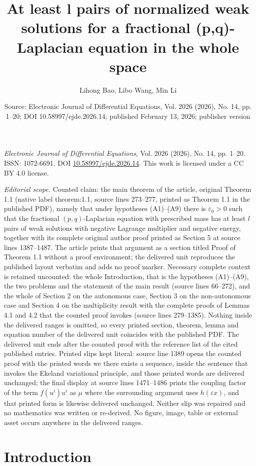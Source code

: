 \documentclass[10pt,a4paper]{amsart}
\title[At least l pairs of normalized weak solutions for a fractional]{At least l pairs of normalized weak solutions for a fractional (p,q)-Laplacian equation in the whole space}
\author{Lihong Bao, Libo Wang, Min Li}
\date{Source: Electronic Journal of Differential Equations, Vol. 2026 (2026), No. 14, pp. 1--20; DOI 10.58997/ejde.2026.14; published February 13, 2026; publisher version}
\numberwithin{equation}{section}
\begin{document}
\maketitle
\noindent\emph{Electronic Journal of Differential Equations}, Vol. 2026 (2026), No. 14, pp. 1--20.\newline
ISSN: 1072-6691. DOI \href{https://doi.org/10.58997/ejde.2026.14}{10.58997/ejde.2026.14}. This work is licensed under a CC BY 4.0 license.\par\smallskip
\noindent\textit{Editorial scope.} Counted claim: the main theorem of the article, original Theorem 1.1 (native label theorem:1.1, source lines 273--277, printed as Theorem 1.1 in the published PDF), namely that under hypotheses (A1)--(A9) there is $\varepsilon_0>0$ such that the fractional $(p,q)$-Laplacian equation with prescribed mass has at least $l$ pairs of weak solutions with negative Lagrange multiplier and negative energy, together with its complete original author proof printed as Section 5 at source lines 1387--1487. The article prints that argument as a section titled Proof of Theorem 1.1 without a proof environment; the delivered unit reproduces the published layout verbatim and adds no proof marker. Necessary complete context is retained uncounted: the whole Introduction, that is the hypotheses (A1)--(A9), the two problems and the statement of the main result (source lines 66--272), and the whole of Section 2 on the autonomous case, Section 3 on the non-autonomous case and Section 4 on the multiplicity result with the complete proofs of Lemmas 4.1 and 4.2 that the counted proof invokes (source lines 279--1385). Nothing inside the delivered ranges is omitted, so every printed section, theorem, lemma and equation number of the delivered unit coincides with the published PDF. The delivered unit ends after the counted proof with the reference list of the cited published entries. Printed slips kept literal: source line 1389 opens the counted proof with the printed words we there exists a sequence, inside the sentence that invokes the Ekeland variational principle, and those printed words are delivered unchanged; the final display at source lines 1471--1486 prints the coupling factor of the term $f(u^{i})u^{i}$ as $\mu$ where the surrounding argument uses $h(\varepsilon x)$, and that printed form is likewise delivered unchanged. Neither slip was repaired and no mathematics was written or re-derived. No figure, image, table or external asset occurs anywhere in the delivered ranges.
\section{Introduction}
\end{document}
